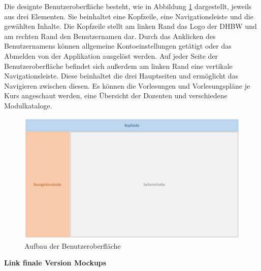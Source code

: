 Die designte Benutzeroberfläche besteht, wie in Abbildung \ref{fig:Seitenaufbau} dargestellt, jeweils aus drei Elementen.
Sie beinhaltet eine Kopfzeile, eine Navigationsleiste und die gewählten Inhalte.
Die Kopfzeile stellt am linken Rand das Logo der \acs{DHBW} und am rechten Rand den Benutzernamen dar.
Durch das Anklicken des Benutzernamens können allgemeine Kontoeinstellungen getätigt oder das Abmelden von der Applikation ausgelöst werden.
Auf jeder Seite der Benutzeroberfläche befindet sich außerdem am linken Rand eine vertikale Navigationsleiste.
Diese beinhaltet die drei Hauptseiten und ermöglicht das Navigieren zwischen diesen.
Es können die Vorlesungen und Vorlesungspläne je Kurs angeschaut werden, eine Übersicht der Dozenten und verschiedene Modulkataloge. 

\begin{figure}[h]
	\centering 
	\includegraphics[width=\textwidth]{img/Seitenaufbau.pdf}
	\captionsetup{format=hang}
	\caption[Aufbau der Benutzeroberfläche]{\label{fig:Seitenaufbau}Aufbau der Benutzeroberfläche}
\end{figure}

\textbf{Link finale Version Mockups}

